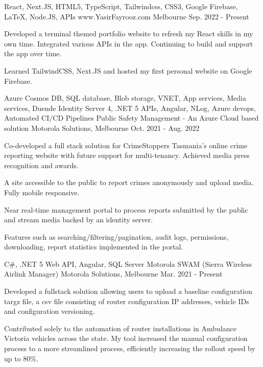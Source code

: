 

\begin{cventries}
  \cventry
    {React, Next.JS, HTML5, TypeScript, Tailwindcss, CSS3, Google Firebase, LaTeX, Node.JS, APIs }
    {www.YasirFayrooz.com}
    {Melbourne}
    {Sep. 2022 - Present}
    {
      \begin{cvitems}
        \item {Developed a terminal themed portfolio website to refresh my React skills in my own time. Integrated various APIs in the app. Continuing to build and support the app over time.}
        \item {Learned TailwindCSS, Next.JS and hosted my first personal website on Google Firebase.}
      \end{cvitems}
    }
  \cventry
    {Azure Cosmos DB, SQL database, Blob storage, VNET, App services, Media services, Duende Identity Server 4, .NET 5 APIs, Angular, NLog, Azure devops, Automated CI/CD Pipelines}
    {Public Safety Management - An Azure Cloud based solution}
    {Motorola Solutions, Melbourne}
    {Oct. 2021 - Aug. 2022}
    {
      \begin{cvitems}
        \item {Co-developed a full stack solution for CrimeStoppers Tasmania's online crime reporting website with future support for multi-tenancy. Achieved media press recognition and awards.}
        \item {A site accessible to the public to report crimes anonymously and upload media. Fully mobile responsive.}
        \item {Near real-time management portal to process reports submitted by the public and stream media backed by an identity server.}
        \item {Features such as searching/filtering/pagination, audit logs, permissions, downloading, report statistics implemented in the portal.}
      \end{cvitems}
    }
  \cventry
    {C\#, .NET 5 Web API, Angular, SQL Server}
    {Motorola SWAM (Sierra Wireless Airlink Manager)}
    {Motorola Solutions, Melbourne}
    {Mar. 2021 - Present}
    {
      \begin{cvitems}
        \item {Developed a fullstack solution allowing users to upload a baseline configuration targz file, a csv file consisting of router configuration IP addresses, vehicle IDs and configuration versioning.}
        \item {Contributed solely to the automation of router installations in Ambulance Victoria vehicles across the state. My tool increased the manual configuration process to a more streamlined process, efficiently increasing the rollout speed by up to 80\%.}

\end{cvitems}}
\end{cventries}
